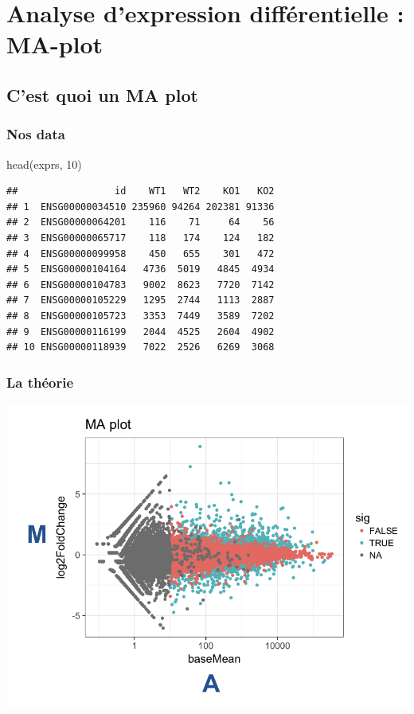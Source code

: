 \documentclass[
]{book}
\newenvironment{Shaded}{\begin{snugshade}}{\end{snugshade}}
\newcommand{\DecValTok}[1]{\textcolor[rgb]{0.00,0.00,0.81}{#1}}
\newcommand{\FunctionTok}[1]{\textcolor[rgb]{0.00,0.00,0.00}{#1}}
\newcommand{\NormalTok}[1]{#1}
\begin{document}
\hypertarget{analyse-dexpression-diffuxe9rentielle-ma-plot}{%
\chapter{Analyse d'expression différentielle : MA-plot}\label{analyse-dexpression-diffuxe9rentielle-ma-plot}}

\hypertarget{cest-quoi-un-ma-plot}{%
\section{C'est quoi un MA plot}\label{cest-quoi-un-ma-plot}}

\hypertarget{nos-data}{%
\subsection{Nos data}\label{nos-data}}

\begin{Shaded}
\begin{Highlighting}[]
\FunctionTok{head}\NormalTok{(exprs, }\DecValTok{10}\NormalTok{)}
\end{Highlighting}
\end{Shaded}

\begin{verbatim}
##                 id    WT1   WT2    KO1   KO2
## 1  ENSG00000034510 235960 94264 202381 91336
## 2  ENSG00000064201    116    71     64    56
## 3  ENSG00000065717    118   174    124   182
## 4  ENSG00000099958    450   655    301   472
## 5  ENSG00000104164   4736  5019   4845  4934
## 6  ENSG00000104783   9002  8623   7720  7142
## 7  ENSG00000105229   1295  2744   1113  2887
## 8  ENSG00000105723   3353  7449   3589  7202
## 9  ENSG00000116199   2044  4525   2604  4902
## 10 ENSG00000118939   7022  2526   6269  3068
\end{verbatim}

\hypertarget{la-thuxe9orie}{%
\subsection{La théorie}\label{la-thuxe9orie}}

\includegraphics{images/MAplot.png}
\end{document}
